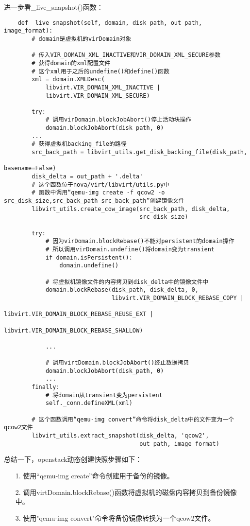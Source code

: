 \documentclass[a4paper,left=1.5cm,right=1.5cm,11pt]{article}
\begin{document}
	进一步看\_live\_snapshot()函数：
	\begin{lstlisting}
	def _live_snapshot(self, domain, disk_path, out_path, image_format):
		# domain是虚拟机的virDomain对象

		# 传入VIR_DOMAIN_XML_INACTIVE和VIR_DOMAIN_XML_SECURE参数
		# 获得domain的xml配置文件
		# 这个xml用于之后的undefine()和define()函数
        xml = domain.XMLDesc(
            libvirt.VIR_DOMAIN_XML_INACTIVE |
            libvirt.VIR_DOMAIN_XML_SECURE)

        try:
			# 调用virDomain.blockJobAbort()停止活动块操作
            domain.blockJobAbort(disk_path, 0)
        ...
		# 获得虚拟机backing_file的路径
        src_back_path = libvirt_utils.get_disk_backing_file(disk_path,
                                                            basename=False)
        disk_delta = out_path + '.delta'
		# 这个函数位于nova/virt/libvirt/utils.py中
		# 函数中调用“qemu-img create -f qcow2 -o src_disk_size,src_back_path src_back_path”创建镜像文件
        libvirt_utils.create_cow_image(src_back_path, disk_delta,
                                       src_disk_size)

        try:
			# 因为virDomain.blockRebase()不能对persistent的domain操作
			# 所以调用virDomain.undefine()将domain变为transient
            if domain.isPersistent():
                domain.undefine()

            # 将虚拟机镜像文件的内容拷贝到disk_delta中的镜像文件中
            domain.blockRebase(disk_path, disk_delta, 0,
                               libvirt.VIR_DOMAIN_BLOCK_REBASE_COPY |
                               libvirt.VIR_DOMAIN_BLOCK_REBASE_REUSE_EXT |
                               libvirt.VIR_DOMAIN_BLOCK_REBASE_SHALLOW)

            ...

			# 调用virtDomain.blockJobAbort()终止数据拷贝
            domain.blockJobAbort(disk_path, 0)
            ...
        finally:
			# 将domain从transient变为persistent
            self._conn.defineXML(xml)

        # 这个函数调用“qemu-img convert”命令将disk_delta中的文件变为一个qcow2文件
        libvirt_utils.extract_snapshot(disk_delta, 'qcow2',
                                       out_path, image_format)
	\end{lstlisting}

	总结一下，openstack动态创建快照步骤如下：
	\begin{itemize}
		\item[1.] 使用“qemu-img create”命令创建用于备份的镜像。
		\item[2.] 调用virtDomain.blockRebase()函数将虚拟机的磁盘内容拷贝到备份镜像中。
		\item[3.] 使用"qemu-img convert"命令将备份镜像转换为一个qcow2文件。
	\end{itemize}
\end{document}
